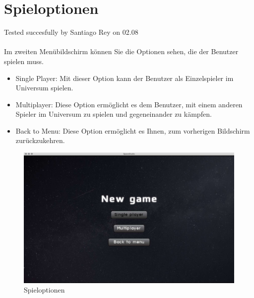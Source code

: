 \documentclass[12pt]{article}
\begin{document}
\section{Spieloptionen}
Tested succesfully by Santiago Rey on 02.08\\\\
Im zweiten Menübildschirm können Sie die Optionen sehen, die der Benutzer spielen muss.
\begin{itemize}
\item Single Player: Mit dieser Option kann der Benutzer als Einzelspieler im Universum spielen.
\item Multiplayer: Diese Option ermöglicht es dem Benutzer, mit einem anderen Spieler im Universum zu spielen und gegeneinander zu kämpfen.
\item Back to Menu: Diese Option ermöglicht es Ihnen, zum vorherigen Bildschirm zurückzukehren.
\end{itemize}
\begin{figure}[h]
\centering
\includegraphics[scale=0.4]{TestProtocolBilder/menuScreenTwo.jpg}
\caption{Spieloptionen}
\end{figure}
\newpage
\end{document}
